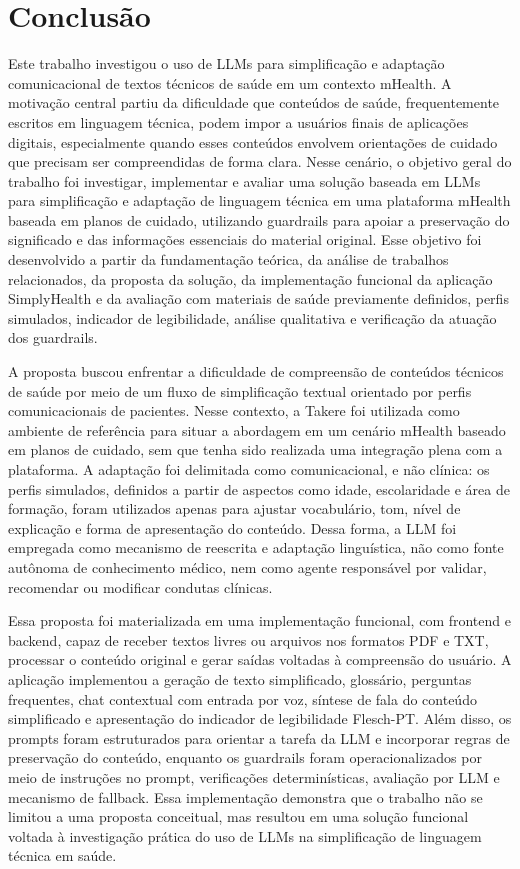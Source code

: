 \chapter{Conclusão}
\label{cap:conclusao}

Este trabalho investigou o uso de LLMs para simplificação e adaptação comunicacional de textos técnicos de saúde em um contexto mHealth. A motivação central partiu da dificuldade que conteúdos de saúde, frequentemente escritos em linguagem técnica, podem impor a usuários finais de aplicações digitais, especialmente quando esses conteúdos envolvem orientações de cuidado que precisam ser compreendidas de forma clara. Nesse cenário, o objetivo geral do trabalho foi investigar, implementar e avaliar uma solução baseada em LLMs para simplificação e adaptação de linguagem técnica em uma plataforma mHealth baseada em planos de cuidado, utilizando guardrails para apoiar a preservação do significado e das informações essenciais do material original. Esse objetivo foi desenvolvido a partir da fundamentação teórica, da análise de trabalhos relacionados, da proposta da solução, da implementação funcional da aplicação SimplyHealth e da avaliação com materiais de saúde previamente definidos, perfis simulados, indicador de legibilidade, análise qualitativa e verificação da atuação dos guardrails.

A proposta buscou enfrentar a dificuldade de compreensão de conteúdos técnicos de saúde por meio de um fluxo de simplificação textual orientado por perfis comunicacionais de pacientes. Nesse contexto, a Takere foi utilizada como ambiente de referência para situar a abordagem em um cenário mHealth baseado em planos de cuidado, sem que tenha sido realizada uma integração plena com a plataforma. A adaptação foi delimitada como comunicacional, e não clínica: os perfis simulados, definidos a partir de aspectos como idade, escolaridade e área de formação, foram utilizados apenas para ajustar vocabulário, tom, nível de explicação e forma de apresentação do conteúdo. Dessa forma, a LLM foi empregada como mecanismo de reescrita e adaptação linguística, não como fonte autônoma de conhecimento médico, nem como agente responsável por validar, recomendar ou modificar condutas clínicas.

Essa proposta foi materializada em uma implementação funcional, com frontend e backend, capaz de receber textos livres ou arquivos nos formatos PDF e TXT, processar o conteúdo original e gerar saídas voltadas à compreensão do usuário. A aplicação implementou a geração de texto simplificado, glossário, perguntas frequentes, chat contextual com entrada por voz, síntese de fala do conteúdo simplificado e apresentação do indicador de legibilidade Flesch-PT. Além disso, os prompts foram estruturados para orientar a tarefa da LLM e incorporar regras de preservação do conteúdo, enquanto os guardrails foram operacionalizados por meio de instruções no prompt, verificações determinísticas, avaliação por LLM e mecanismo de fallback. Essa implementação demonstra que o trabalho não se limitou a uma proposta conceitual, mas resultou em uma solução funcional voltada à investigação prática do uso de LLMs na simplificação de linguagem técnica em saúde.

